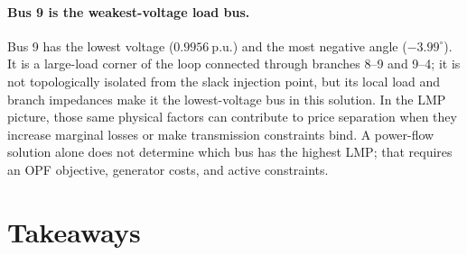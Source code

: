 \documentclass[11pt]{article}
\newcommand{\pu}{\mathrm{p.u.}}
\begin{document}
\paragraph{Bus 9 is the weakest-voltage load bus.}
Bus 9 has the lowest voltage ($0.9956~\pu$) and the most negative angle
($-3.99^\circ$). It is a large-load corner of the loop connected through
branches 8--9 and 9--4; it is not topologically isolated from the slack
injection point, but its local load and branch impedances make it the
lowest-voltage bus in this solution. In the LMP picture, those same
physical factors can contribute to price separation when they increase
marginal losses or make transmission constraints bind. A power-flow
solution alone does not determine which bus has the highest LMP; that
requires an OPF objective, generator costs, and active constraints.

\section{Takeaways}
\end{document}
